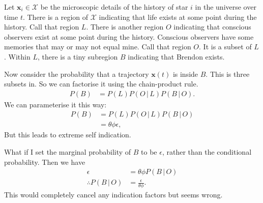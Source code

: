 \documentclass[a4paper, 12pt]{article}
\title{}
\author{}
\date{}
\newcommand{\given}{\,|\,}
\begin{document}
\maketitle


\setlength{\parindent}{0pt}
\setlength{\parskip}{8pt}

Let $\boldsymbol{x}_i \in \mathcal{X}$ be the microscopic details of the
history of star
$i$ in the universe over time $t$. There is a region of $\mathcal{X}$ indicating
that life exists at some point during the history.
Call that region $L$. There is another region
$O$ indicating that conscious observers exist at some point during the history.
Conscious observers have some memories that may or may not equal mine.
Call that region $O$. It is a subset of
$L$. Within $L$, there is a tiny subregion $B$ indicating that Brendon exists.

Now consider the probability that a trajectory $\boldsymbol{x}(t)$ is inside
$B$. This is three subsets in. So we can factorise it using the chain-product
rule.
\begin{align}
P(B) &= P(L)P(O \given L)P(B \given O).
\end{align}
We can parameterise it this way:
\begin{align}
P(B) &= P(L)P(O \given L)P(B \given O) \\
     &= \theta\phi\epsilon,
\end{align}
But this leads to extreme self indication.

What if I set the marginal probability of $B$ to be $\epsilon$, rather than
the conditional probability. Then we have
\begin{align}
\epsilon &= \theta\phi P(B \given O) \\
\therefore
P(B \given O) &= \frac{\epsilon}{\theta\phi}.
\end{align}
This would completely cancel any indication factors but seems wrong.
\end{document}
